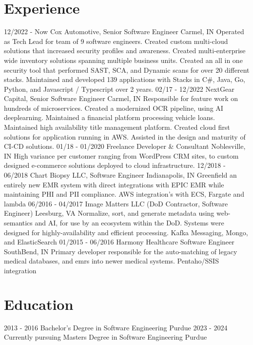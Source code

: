 \documentclass[]{friggeri-cv}
\begin{document}
\section{Experience}
\begin{entrylist}
	  \entry
	{12/2022 - Now}
	{Cox Automotive, Senior Software Engineer}
	{Carmel, IN}
	{ Operated as Tech Lead for team of 9 software engineers. Created custom multi-cloud solutions that increased security profiles and awareness. Created multi-enterprise wide inventory solutions spanning multiple business units. Created an all in one security tool that performed SAST, SCA, and Dynamic scans for over 20 different stacks. Maintained and developed 139 applications with Stacks in C\#, Java, Go, Python, and Javascript / Typescript over 2 years.   }
  \entry
    {02/17 - 12/2022}
    {NextGear Capital, Senior Software Engineer}
    {Carmel, IN}
    {Responsible for feature work on hundreds of microservices. Created a modernized OCR pipeline, using AI deeplearning. Maintained a financial platform processing vehicle loans. Maintained high availability title management platform. Created cloud first solutions for application running in AWS. Assisted in the design and maturity of CI-CD solutions.  }
  \entry
    {01/18 - 01/2020}
    {Freelance Developer \& Consultant}
    {Noblesville, IN}
    {High variance per customer ranging from WordPress CRM sites, to custom designed e-commerce solutions deployed to cloud infrastructure. }
    \entry
    {12/2018 - 06/2018}
    {Chart Biopsy LLC, Software Engineer}
    {Indianapolis, IN}
    {Greenfield an entirely new EMR system with direct integrations with EPIC EMR while maintaining PHI and PII compliance. AWS integration's with ECS, Fargate and lambda }
    \entry
    {06/2016 - 04/2017}
    {Image Matters LLC (DoD Contractor, Software Engineer)}
    {Leesburg, VA}
    {Normalize, sort, and generate metadata using web-semantics and AI, for use by an ecosystem within the DoD. Systems were designed for highly-availability and efficient processing. Kafka Messaging, Mongo, and ElasticSearch }
    \entry
    {01/2015 - 06/2016}
    {Harmony Healthcare Software Engineer}
    {SouthBend, IN}
    {Primary developer responsible for the auto-matching of legacy medical databases, and emrs into newer medical systems. Pentaho/SSIS integration}
\end{entrylist}

\section{Education}
\begin{entrylist}
  \entry
    {2013 - 2016}
    {Bachelor's Degree in Software Engineering}
    {Purdue}
    {}
  \entry
   {2023 - 2024}
   {Currently pursuing Masters Degree in Software Engineering}
   {Purdue}
   {}
\end{entrylist}
\end{document}
